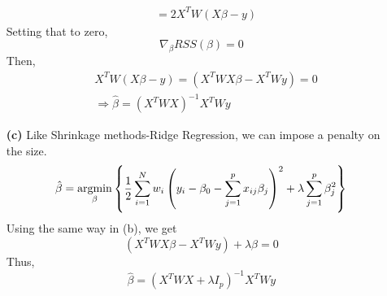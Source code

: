 \documentclass[10pt]{article}
\begin{document}
\begin{enumerate}[1.]
$$\begin{aligned}
			\\&=2X^T W (X\beta-y)
		\end{aligned}
		$$
		Setting that to zero, 
		$$\nabla_{\beta} RSS(\beta) = 0$$
		Then, 
		$$
		\begin{aligned}
			&X^T W (X\beta-y) =  (X^T W X\beta- X^T Wy) = 0
			\\&\Rightarrow \hat{\beta} = (X^T W X)^{-1}X^T Wy
		\end{aligned}
		$$
		\item[\textbf{(c)}] 
		Like Shrinkage methods-Ridge Regression, we can impose a penalty on the size.
		$$\hat{\beta} = \underset{\beta}{\mathop{\rm argmin}}\left\{\frac{1}{2}\sum_{i=1}^{N}w_i\left(y_{i}-\beta_{0}-\sum_{j=1}^{p} x_{i j} \beta_{j}\right)^{2}+\lambda \sum_{j=1}^{p} \beta_j ^2\right\}$$ 
		Using the same way in (b), we get
		$$(X^T W X\beta- X^T Wy)+\lambda \beta = 0$$
		Thus, 
		$$\hat{\beta} = (X^T W X+\lambda I_p)^{-1}X^T Wy$$
	\end{enumerate}
\end{document}
